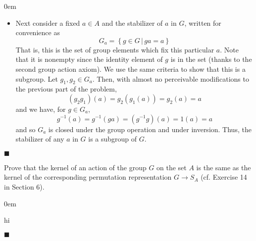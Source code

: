 \documentclass[12pt]{article}
\renewcommand{\qed}{\hfill$\blacksquare$}
\renewenvironment{proof}{\begin{addmargin}[1em]{0em}\begin{newproof}}{\end{newproof}\end{addmargin}\qed}
\newenvironment{problem}[2][Exercise]{\begin{trivlist}
\item[\hskip \labelsep {\bfseries #1}\hskip \labelsep {\bfseries #2.}]}{\end{trivlist}}
\begin{document}
\begin{proof}
\begin{itemize}
    \item Next consider a fixed $a\in A$ and the stabilizer of $a$ in $G$, written for convenience as
    $$ G_a = \left\{ g\in G \, | \, ga=a \right\} $$ That is, this is the set of group elements which fix this particular $a$. Note that it is nonempty since the identity element of $g$ is in the set (thanks to the second group action axiom). We use the same criteria to show that this is a subgroup. Let $g_1,g_2\in G_a$. Then, with almost no perceivable  modifications to the previous part of the problem,
    $$ \left(g_2g_1\right)\left(a\right) = g_2\left(g_1\left(a\right)\right) = g_2\left(a\right) = a $$
    and we have, for $g\in G_a$,
    $$ g^{-1}\left(a\right) = g^{-1}\left(ga\right) = \left(g^{-1}g\right)\left(a\right)=1\left(a\right)= a $$ and so $G_a$ is closed under the group operation and under inversion. Thus, the stabilizer of any $a$ in $G$ is a subgroup of $G$.
\end{itemize}
\end{proof}





\begin{problem}{1.7.5}
Prove that the kernel of an action of the group $G$ on the set $A$ is the same as the kernel of the corresponding permutation representation $G\rightarrow S_A$ (cf. Exercise 14 in Section 6).
\end{problem}
\begin{proof}
hi
\end{proof}
\end{document}
